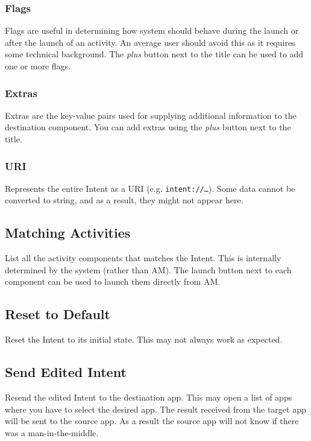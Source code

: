 \subsubsection{Flags}
Flags are useful in determining how system should behave during the launch or after the launch of an activity. An
average user should avoid this as it requires some technical background. The \textit{plus} button next to the title can
be used to add one or more flags.

\subsubsection{Extras}
Extras are the key-value pairs used for supplying additional information to the destination component. You can add
extras using the \textit{plus} button next to the title.

\subsubsection{URI}
Represents the entire Intent as a URI (e.g. \texttt{intent://\dots}). Some data cannot be converted to string, and as a
result, they might not appear here.

\subsection{Matching Activities}\label{subsec:matching-activities}
List all the activity components that matches the Intent. This is internally determined by the system (rather than AM).
The launch button next to each component can be used to launch them directly from AM\@.

\subsection{Reset to Default}\label{subsec:interceptor-reset-to-default}
Reset the Intent to its initial state. This may not always work as expected.

\subsection{Send Edited Intent}\label{subsec:interceptor-send-edited-intent}
Resend the edited Intent to the destination app. This may open a list of apps where you have to select the desired app.
The result received from the target app will be sent to the source app. As a result the source app will not know if
there was a man-in-the-middle.
